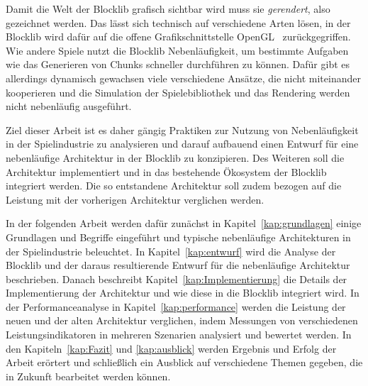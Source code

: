 Damit die Welt der Blocklib grafisch sichtbar wird muss sie \emph{gerendert}, also gezeichnet werden. Das lässt sich technisch auf verschiedene Arten lösen, in der Blocklib wird dafür auf die offene Grafikschnittstelle OpenGL~\cite{TheKhronosGroup,Vries2020} zurückgegriffen. Wie andere Spiele nutzt die Blocklib Nebenläufigkeit, um bestimmte Aufgaben wie das Generieren von Chunks schneller durchführen zu können. Dafür gibt es allerdings dynamisch gewachsen viele verschiedene Ansätze, die nicht miteinander kooperieren und die Simulation der Spielebibliothek und das Rendering werden nicht nebenläufig ausgeführt.

Ziel dieser Arbeit ist es daher gängig Praktiken zur Nutzung von Nebenläufigkeit in der Spielindustrie zu analysieren und darauf aufbauend einen Entwurf für eine nebenläufige Architektur in der Blocklib zu konzipieren. Des Weiteren soll die Architektur implementiert und in das bestehende Ökosystem der Blocklib integriert werden. Die so entstandene Architektur soll zudem bezogen auf die Leistung mit der vorherigen Architektur verglichen werden.

In der folgenden Arbeit werden dafür zunächst in Kapitel~\ref{kap:grundlagen} einige Grundlagen und Begriffe eingeführt und typische nebenläufige Architekturen in der Spielindustrie beleuchtet. In Kapitel~\ref{kap:entwurf} wird die Analyse der Blocklib und der daraus resultierende Entwurf für die nebenläufige Architektur beschrieben. Danach beschreibt Kapitel~\ref{kap:Implementierung} die Details der Implementierung der Architektur und wie diese in die Blocklib integriert wird. In der Performanceanalyse in Kapitel~\ref{kap:performance} werden die Leistung der neuen und der alten Architektur verglichen, indem Messungen von verschiedenen Leistungsindikatoren in mehreren Szenarien analysiert und bewertet werden. In den Kapiteln~\ref{kap:Fazit} und \ref{kap:ausblick} werden Ergebnis und Erfolg der Arbeit erörtert und schließlich ein Ausblick auf verschiedene Themen gegeben, die in Zukunft bearbeitet werden können.